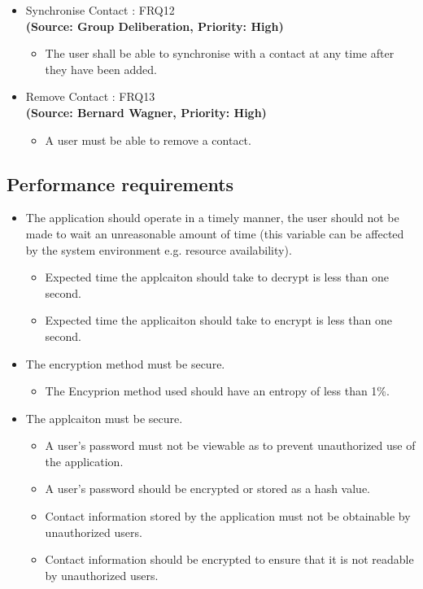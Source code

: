 \begin{itemize}
\item{Synchronise Contact : FRQ12}\\
\textbf{(Source: Group Deliberation, Priority: High)}
\begin{itemize}
\item The user shall be able to synchronise with a contact at any time after they have been added.
\end{itemize}
\item{Remove Contact : FRQ13}\\
\textbf{(Source: Bernard Wagner, Priority: High)}
\begin{itemize}
\item A user must be able to remove a contact.
\end{itemize}
\end{itemize}

\subsection{Performance requirements}
\begin{itemize}
\item The application should operate in a timely manner, the user should not be made to wait an unreasonable amount of time (this variable can be affected by the system environment e.g. resource availability).
\begin{itemize}
\item Expected time the applcaiton should take to decrypt is less than one second.
\item Expected time the applicaiton should take to encrypt is less than one second.
\end{itemize}
\item The encryption method must be secure.
\begin{itemize}
\item The Encyprion method used should have an entropy of less than 1\%.
\end{itemize}
\item The applcaiton must be secure.
\begin{itemize}
\item A user’s password must not be viewable as to prevent unauthorized use of the application.
\item A user’s password should be encrypted or stored as a hash value.
\item Contact information stored by the application must not be obtainable by unauthorized users.
\item Contact information should be encrypted to ensure that it is not readable by unauthorized users.
\end{itemize}
\end{itemize}

